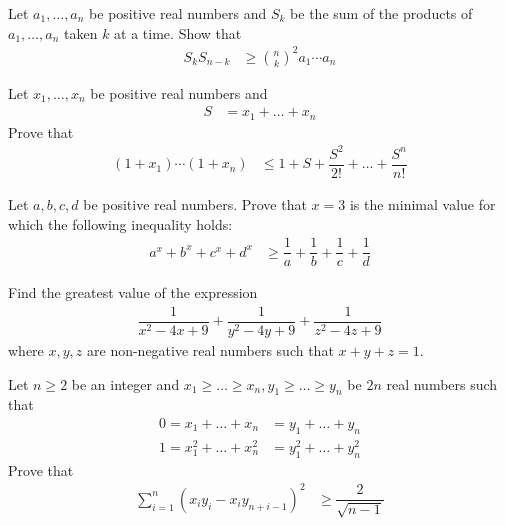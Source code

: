 \documentclass{subfile}
\begin{document}
		\begin{problem}
			Let $a_{1},\ldots,a_{n}$ be positive real numbers and $S_{k}$ be the sum of the products of $a_{1},\ldots,a_{n}$ taken $k$ at a time. Show that
				\begin{align*}
					S_{k}S_{n-k}
						& \geq\binom{n}{k}^{2}a_{1}\cdots a_{n}
				\end{align*}
		\end{problem}
	
		\begin{problem}
			Let $x_{1},\ldots,x_{n}$ be positive real numbers and
				\begin{align*}
					S
						& = x_{1}+\ldots+x_{n}
				\end{align*}
			Prove that
				\begin{align*}
					(1+x_{1})\cdots(1+x_{n})
						& \leq 1+S+\dfrac{S^2}{2!}+\ldots+\dfrac{S^n}{n!}
				\end{align*}
		\end{problem}
	
		\begin{problem}
			Let $a,b,c,d$ be positive real numbers. Prove that $x=3$ is the minimal value for which the following inequality holds:
				\begin{align*}
					a^{x}+b^{x}+c^{x}+d^{x}
						& \geq\dfrac{1}{a}+\dfrac{1}{b}+\dfrac{1}{c}+\dfrac{1}{d}
				\end{align*}
		\end{problem}
	
		\begin{problem}
			Find the greatest value of the expression
				\begin{align*}
					\dfrac{1}{x^{2}-4x+9}+\dfrac{1}{y^{2}-4y+9}+\dfrac{1}{z^{2}-4z+9}
				\end{align*}
			where $x,y,z$ are non-negative real numbers such that $x+y+z=1$.
		\end{problem}
	
		\begin{problem}
			Let $n\geq2$ be an integer and $x_{1}\geq\ldots\geq x_{n},y_{1}\geq\ldots\geq y_{n}$ be $2n$ real numbers such that
				\begin{align*}
					0 = x_{1}+\ldots+x_{n}
						& = y_{1}+\ldots+y_{n}\\
					1 = x_{1}^{2}+\ldots+x_{n}^{2}
						& = y_{1}^{2}+\ldots+y_{n}^{2}
				\end{align*}
			Prove that
				\begin{align*}
					\sum_{i=1}^{n}(x_{i}y_{i}-x_{i}y_{n+i-1})^{2}
						& \geq\dfrac{2}{\sqrt{n-1}}
				\end{align*}
		\end{problem}
	
\end{document}
